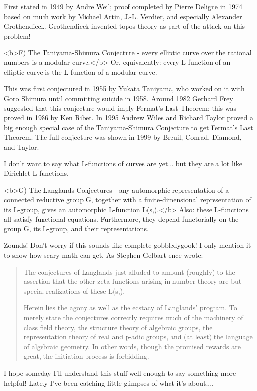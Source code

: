 First stated in 1949 by Andre Weil; proof completed by Pierre Deligne 
in 1974 based on much work by Michael Artin, J.-L. Verdier, and especially 
Alexander Grothendieck.  Grothendieck invented topos theory as part of 
the attack on this problem!

<b>F) The Taniyama-Shimura Conjecture - every elliptic curve over the rational 
numbers is a modular curve.</b>  Or, equivalently: every L-function of an 
elliptic curve is the L-function of a modular curve.  

This was first conjectured in 1955 by Yukata Taniyama, who worked on it 
with Goro Shimura until committing suicide in 1958.  Around 1982 Gerhard 
Frey suggested that this conjecture would imply Fermat's Last Theorem; this 
was proved in 1986 by Ken Ribet.  In 1995 Andrew Wiles and Richard Taylor 
proved a big enough special case of the Taniyama-Shimura Conjecture to get 
Fermat's Last Theorem.  The full conjecture was shown in 1999 by Breuil, 
Conrad, Diamond, and Taylor.

I don't want to say what L-functions of curves are yet... but they
are a lot like Dirichlet L-functions.

<b>G) The Langlands Conjectures - any automorphic representation \pi  of a 
connected reductive group G, together with a finite-dimensional representation 
of its L-group, gives an automorphic L-function L(s,\pi ).</b>  Also:
these L-functions 
all satisfy functional equations.  Furthermore, they depend functorially on
the group G, its L-group, and their representations. 

Zounds!  Don't worry if this sounds like complete gobbledygook!  I only 
mention it to show how scary math can get.  As Stephen Gelbart once wrote:

\begin{quote}
     The conjectures of Langlands just alluded to amount (roughly)
     to the assertion that the other zeta-functions arising in 
     number theory are but special realizations of these L(s,\pi ).

     Herein lies the agony as well as the ecstacy of Langlands'
     program.  To merely state the conjectures correctly requires
     much of the machinery of class field theory, the structure
     theory of algebraic groups, the representation theory of real
     and p-adic groups, and (at least) the language of algebraic
     geometry.  In other words, though the promised rewards are 
     great, the initiation process is forbidding.
\end{quote}
I hope someday I'll understand this stuff well enough to say something more 
helpful!  Lately I've been catching little glimpses of what it's about....

